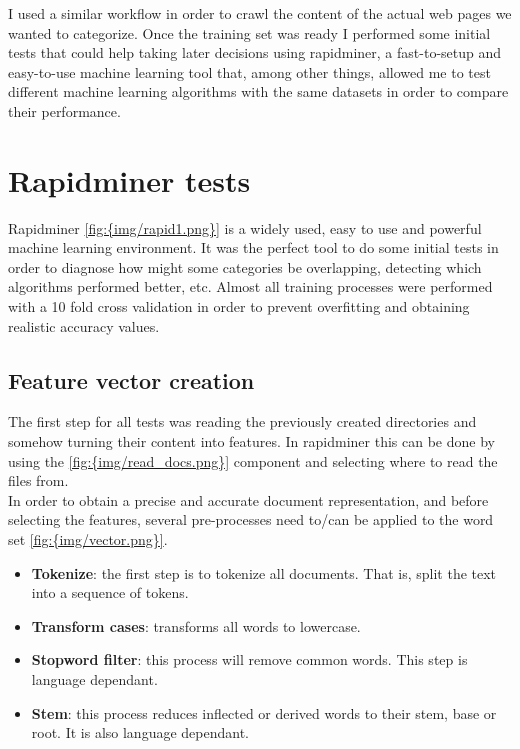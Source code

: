 \clearpage
{}

I used a similar workflow in order to crawl the content of the actual web pages we wanted to categorize.
Once the training set was ready I performed some initial tests that could help taking later decisions using rapidminer\cite{rapidminer}, a fast-to-setup and easy-to-use machine learning tool that, 
among other things, allowed me to test different machine learning algorithms with the same datasets in order to compare their performance. 

  

\section{Rapidminer tests}
Rapidminer\cite{rapidminer} \ref{fig:{img/rapid1.png}} is a widely used, easy to use and powerful machine learning environment.  
It was the perfect tool to do some initial tests in order to diagnose how might some categories be overlapping, detecting which algorithms performed better, etc. Almost all training processes were 
performed with a 10 fold cross validation in order to prevent overfitting and obtaining realistic accuracy values.

\subsection{Feature vector creation}
The first step for all tests was reading the previously created directories and somehow turning their content into features. In rapidminer this can be done by using the 
\ref{fig:{img/read_docs.png}}
component and selecting where to read the files from.\\
In order to obtain a precise and accurate document representation, and before selecting the features, several pre-processes need to/can be applied to the word set \ref{fig:{img/vector.png}}.
\begin{itemize}
  \item {\bf Tokenize}: the first step is to tokenize all documents. That is, split the text into a sequence of tokens. 
  \item {\bf Transform cases}: transforms all words to lowercase.
  \item {\bf Stopword filter}: this process will remove common words. This step is language dependant.
  \item {\bf Stem}: this process reduces inflected or derived words to their stem, base or root. It is also language dependant.
\end{itemize}


